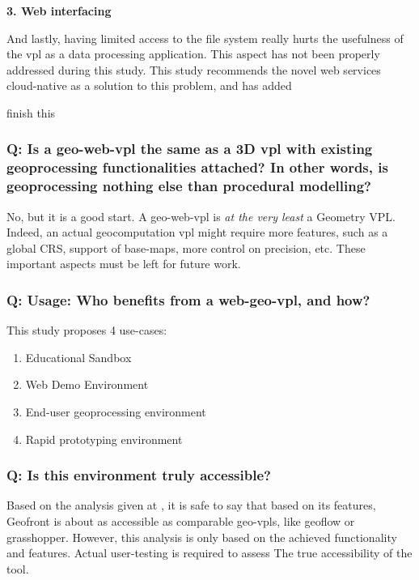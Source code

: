 \textbf{3. Web interfacing}

And lastly, having limited access to the file system really hurts the usefulness of the vpl as a data processing application.
This aspect has not been properly addressed during this study.
This study recommends the novel web services cloud-native as a solution to this problem, and has added 
  
\begin{note}
  finish this
\end{note}

\subsubsection*{Q: Is a geo-web-vpl the same as a 3D vpl with existing geoprocessing functionalities attached? In other words, is geoprocessing nothing else than procedural modelling?}

No, but it is a good start. 
A geo-web-vpl is \emph{at the very least} a Geometry VPL. 
Indeed, an actual geocomputation vpl might require more features, such as a global CRS, support of base-maps, more control on precision, etc. 
These important aspects must be left for future work.

\subsubsection*{Q: Usage: Who benefits from a web-geo-vpl, and how? }
This study proposes 4 use-cases:
\begin{enumerate}[-]
  \item Educational Sandbox
  \item Web Demo Environment
  \item End-user geoprocessing environment 
  \item Rapid prototyping environment
\end{enumerate}

\subsubsection*{Q: Is this environment truly accessible?}

Based on the analysis given at , it is safe to say that based on its features, Geofront is about as accessible as comparable geo-vpls, like geoflow or grasshopper. 
However, this analysis is only based on the achieved functionality and features. 
Actual user-testing is required to assess The true accessibility of the tool.

